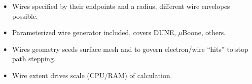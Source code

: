 \documentclass[xcolor=dvipsnames]{beamer}
\begin{document}
\begin{frame}
\begin{columns}
\begin{column}{0.5\textwidth}
        \footnotesize
      \begin{itemize}
      \item Wires specified by their endpoints and a radius, 
        different wire envelopes possible.
      \item Parameterized wire generator included, covers DUNE, $\mu$Boone,
        others.
      \item Wires geometry seeds surface mesh and to govern
        electron/wire ``hits'' to stop path stepping.
      \item Wire extent drives scale (CPU/RAM) of calculation.
      \end{itemize}
    \end{column}
  \end{columns}

\end{frame}
\end{document}
